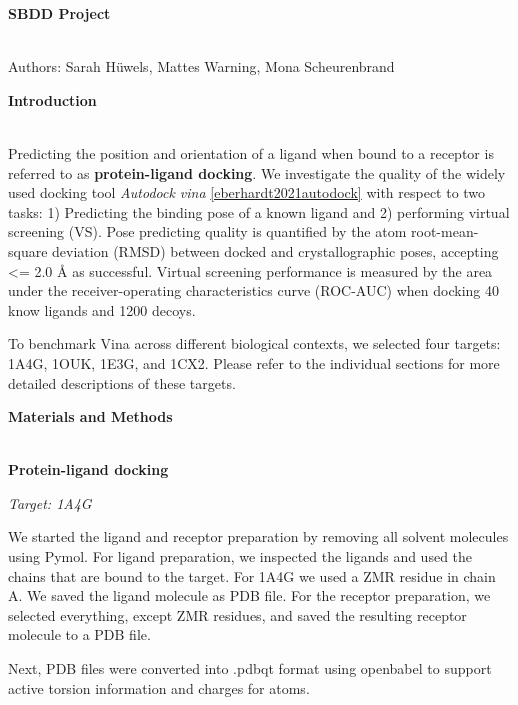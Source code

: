 \documentclass[a4paper,10pt]{article}
\begin{document}


\begin{huge}
	\vspace{1cm}
	\textbf{SBDD Project}
\end{huge} \\

Authors: Sarah Hüwels, Mattes Warning, Mona Scheurenbrand 

\begin{large}
	\vspace{0.5cm}
	\textbf{Introduction}
\end{large}	\\ [1mm]

Predicting the position and orientation of a ligand when bound to a receptor is referred to as \textbf{protein-ligand docking}.
We investigate the quality of the widely used docking tool \textit{Autodock vina} \ref{eberhardt2021autodock} with respect to two tasks: 1) Predicting the binding pose of a known ligand and
2) performing virtual screening (VS). Pose predicting quality is quantified by the atom root-mean-square deviation (RMSD) between docked and crystallographic poses, accepting <= 2.0 Å as successful.
Virtual screening performance is measured by the area under the receiver-operating characteristics curve (ROC-AUC) when docking 40 know ligands and 1200 decoys.

To benchmark Vina across different biological contexts, we selected four targets: 1A4G, 1OUK, 1E3G, and 1CX2. Please refer to the individual sections for more detailed descriptions of these targets.

\begin{large}
	\vspace{0.5cm}
	\textbf{Materials and Methods}
\end{large}	\\ [1mm]

\textbf{Protein-ligand docking}

\textit{Target: 1A4G}

We started the ligand and receptor preparation by removing all solvent molecules using Pymol. 
For ligand preparation, we inspected the ligands and used the chains that are bound to the target. For 1A4G we used a ZMR residue in chain A. We saved the ligand molecule as PDB file.
For the receptor preparation, we selected everything, except ZMR residues, and saved the resulting receptor molecule to a PDB file.

Next, PDB files were converted into .pdbqt format using openbabel to support active torsion information and charges for atoms. 
\end{document}
